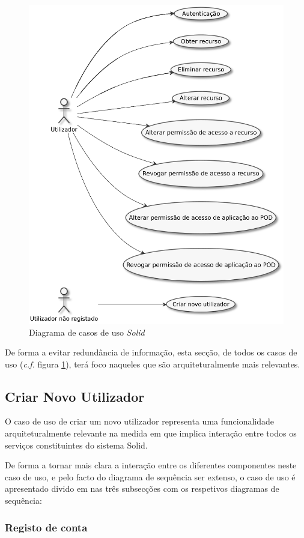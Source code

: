\begin{figure}[h]
    \begin{center}
    \includegraphics[height=0.9 \textwidth]{figures/uc_diagram.eps}
    \caption{Diagrama de casos de uso
    \emph{Solid}}
    \label{uc_diagram}
    \end{center}
\end{figure}

De forma a evitar redundância de informação, esta secção, de todos os casos de uso (\emph{c.f.} figura \ref{uc_diagram}), terá foco naqueles que são arquiteturalmente mais relevantes.

\subsection{Criar Novo Utilizador \label{create_user_use_case_design}}

O caso de uso de criar um novo utilizador representa uma funcionalidade arquiteturalmente relevante na medida em que implica interação entre todos os serviços constituintes do sistema Solid.

De forma a tornar mais clara a interação entre os diferentes componentes neste caso de uso, e pelo facto do diagrama de sequência ser extenso, o caso de uso é apresentado divido em nas três subsecções com os respetivos diagramas de sequência:

\subsubsection{Registo de conta}


